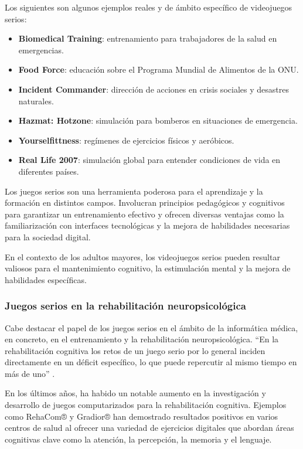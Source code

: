 Los siguientes son algunos ejemplos reales y de ámbito específico de videojuegos serios:
\begin{itemize}[leftmargin=1.5cm, topsep=2.2pt, itemsep=1pt]
    \item \textbf{Biomedical Training}: entrenamiento para trabajadores de la salud en emergencias.
    \item \textbf{Food Force}: educación sobre el Programa Mundial de Alimentos de la ONU.
    \item \textbf{Incident Commander}: dirección de acciones en crisis sociales y desastres naturales.
    \item \textbf{Hazmat: Hotzone}: simulación para bomberos en situaciones de emergencia.
    \item \textbf{Yourselfittness}: regímenes de ejercicios físicos y aeróbicos.
    \item \textbf{Real Life 2007}: simulación global para entender condiciones de vida en diferentes países.
\end{itemize}

Los juegos serios son una herramienta poderosa para el aprendizaje y la formación en distintos campos. Involucran principios pedagógicos y cognitivos para garantizar un entrenamiento efectivo y ofrecen diversas ventajas como la familiarización con interfaces tecnológicas y la mejora de habilidades necesarias para la sociedad digital.

En el contexto de los adultos mayores, los videojuegos serios pueden resultar valiosos para el mantenimiento cognitivo, la estimulación mental y la mejora de habilidades específicas.

\newpage
\subsubsection{Juegos serios en la rehabilitación neuropsicológica}

Cabe destacar el papel de los juegos serios en el ámbito de la informática médica, en concreto, en el entrenamiento y la rehabilitación neuropsicológica.  \enquote{En la rehabilitación cognitiva los retos de un juego serio por lo general inciden directamente en un déficit específico, lo que puede repercutir al mismo tiempo en más de uno} \parencite{juegosSerios2}.

En los últimos años, ha habido un notable aumento en la investigación y desarrollo de juegos computarizados para la rehabilitación cognitiva. Ejemplos como RehaCom® y Gradior® \parencite{ICTestudios} han demostrado resultados positivos en varios centros de salud al ofrecer una variedad de ejercicios digitales que abordan áreas cognitivas clave como la atención, la percepción, la memoria y el lenguaje. 

